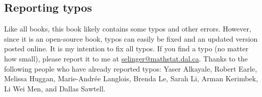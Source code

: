 \subsection*{Reporting typos}

Like all books, this book likely contains some typos and other
errors. However, since it is an open-source book, typos can easily be
fixed and an updated version posted online. It is my intention to fix
all typos. If you find a typo (no matter how small), please report it
to me at
\href{mailto:selinger@mathstat.dal.ca}{selinger@mathstat.dal.ca}. Thanks
to the following people who have already reported typos: Yaser
Alkayale, Robert Earle, Melissa Huggan, Marie-Andr\'ee Langlois,
Brenda Le, Sarah Li, Arman Kerimbek, Li Wei Men, and Dallas Sawtell.
